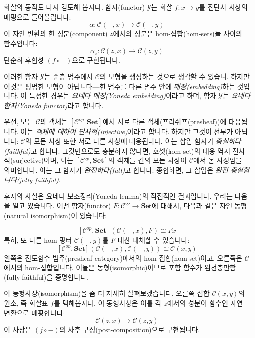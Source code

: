 \documentclass[DaoFP]{subfiles}
\begin{document}
화살의 동작도 다시 검토해 봅시다. 함자(functor) $\mathcal{Y}$는 화살 $f \colon x \to y$를 전단사 사상의 매핑으로 들어올립니다:
\[ \alpha \colon \mathcal{C}(-, x) \to \mathcal{C}(-, y) \]
이 자연 변환의 한 성분(component) $z$에서의 성분은 hom-집합(hom-sets)들 사이의 함수입니다:
\[ \alpha_z \colon \mathcal{C}(z, x) \to \mathcal{C}(z, y) \]
단순히 후합성 $(f \circ -)$으로 구현됩니다.

이러한 함자 $\mathcal{Y}$는 준층 범주에서 $\mathcal{C}$의 모형을 생성하는 것으로 생각할 수 있습니. 하지만 이것은 평범한 모형이 아닙니다---한 범주를 다른 범주 안에 \emph{매장(embedding)}하는 것입니다. 이 특정한 경우는 \emph{요네다 매장(Yoneda embedding)}이라고 하며, 함자 $\mathcal{Y}$는 \emph{요네다 함자(Yoneda functor)}라고 합니다.

우선, 모든 $\mathcal{C}$의 객체는 $[\mathcal{C}^{op},  \mathbf{Set}]$에서 서로 다른 객체(프리쉬프(presheaf))에 대응됩니다. 이는 \emph{객체에 대하여 단사적(injective)}이라고 합니다. 하지만 그것이 전부가 아닙니다: $\mathcal{C}$의 모든 사상 또한 서로 다른 사상에 대응됩니다. 이는 삽입 함자가 \emph{충실하다(faithful)}고 합니다. 그것만으로도 충분하지 않다면, 호셋(hom-set)의 대응 역시 전사적(surjective)이며, 이는 $[\mathcal{C}^{op},  \mathbf{Set}]$의 객체들 간의 모든 사상이 $\mathcal{C}$에서 온 사상임을 의미합니다. 이는 그 함자가 \emph{완전하다(full)}고 합니다. 종합하면, 그 삽입은 \emph{완전 충실합니다(fully faithful)}.

후자의 사실은 요네다 보조정리(Yoneda lemma)의 직접적인 결과입니다. 우리는 다음을 알고 있습니다. 어떤 함자(functor) $F \colon \mathcal{C}^{op} \to \mathbf{Set}$에 대해서, 다음과 같은 자연 동형(natural isomorphism)이 있습니다:

\[ [\mathcal{C}^{op}, \mathbf{Set}]( \mathcal{C}(-, x), F) \cong F x \]
특히, 또 다른 hom-펑터 $\mathcal{C}(-, y)$를 $F$ 대신 대체할 수 있습니다:
\[ [\mathcal{C}^{op}, \mathbf{Set}]( \mathcal{C}(-, x), \mathcal{C}(-, y)) \cong \mathcal{C}(x, y)\]
왼쪽은 전도함수 범주(presheaf category)에서의 hom-집합(hom-set)이고, 오른쪽은 $\mathcal{C}$에서의 hom-집합입니다. 이들은 동형(isomorphic)이므로 포함 함수가 완전충만함(fully faithful)을 증명합니다.

이 동형사상(isomorphism)을 좀 더 자세히 살펴보겠습니다. 오른쪽 집합 $\mathcal{C}(x, y)$의 원소, 즉 화살표 $f$를 택해봅시다. 이 동형사상은 이를 각 $z$에서의 성분이 함수인 자연 변환으로 매핑합니다:
\[ \mathcal{C}(z, x) \to \mathcal{C}(z, y) \]
이 사상은 $(f \circ -)$의 사후 구성(post-composition)으로 구현됩니다.
\end{document}
